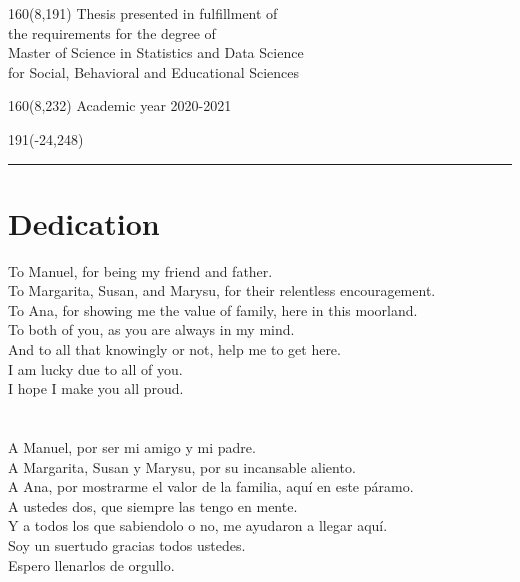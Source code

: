 \documentclass[12pt,a4paper,oneside]{book}
\begin{document}
%
\begin{textblock}{160}(8,191)
\textblockcolour{}
\vspace{-\parskip}
\flushright
Thesis presented in fulfillment of\\[4.5pt]
the requirements for the degree of\\[4.5pt]
Master of Science in Statistics and Data Science\\[4.5pt]
for Social, Behavioral and Educational Sciences
\end{textblock}
%
\begin{textblock}{160}(8,232)
\textblockcolour{}
\vspace{-\parskip}
\flushright
Academic year 2020-2021
\end{textblock}
%
\begin{textblock}{191}(-24,248)
{\color{blueline}\rule{550pt}{5.5pt}}
\end{textblock}
%
\vfill
\newpage
%
\rmfamily
\setcounter{page}{0}
\stackMath
%
\chapter*{Dedication}
\noindent To Manuel, for being my friend and father. \\
To Margarita, Susan, and Marysu, for their relentless encouragement. \\
To Ana, for showing me the value of family, here in this moorland. \\
To both of you, as you are always in my mind. \\
And to all that knowingly or not, help me to get here.\\
I am lucky due to all of you. \\
I hope I make you all proud. \\ \\ \\
%
%
\noindent A Manuel, por ser mi amigo y mi padre. \\
A Margarita, Susan y Marysu, por su incansable aliento. \\
A Ana, por mostrarme el valor de la familia, aqu\'i en este p\'aramo.\\
A ustedes dos, que siempre las tengo en mente. \\
Y a todos los que sabiendolo o no, me ayudaron a llegar aqu\'i.\\
Soy un suertudo gracias todos ustedes. \\
Espero llenarlos de orgullo.
%
%
\end{document}
